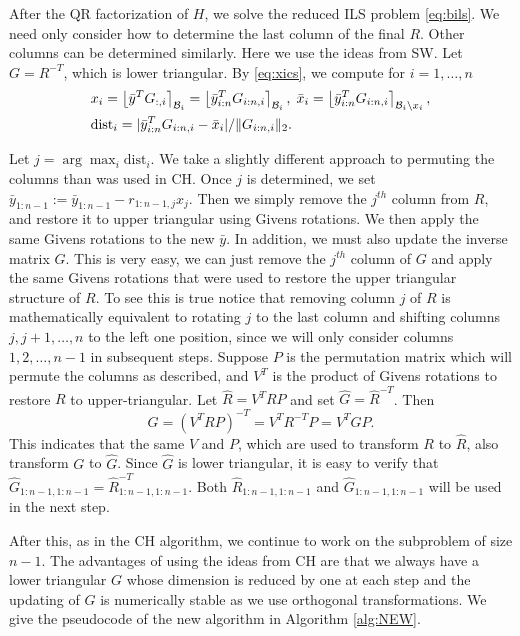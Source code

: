 \documentclass[conference]{IEEEtran}
\newcommand{\dist}{\mathrm{dist}}
\begin{document}
After the QR factorization of $H$, we  solve the reduced ILS problem \eqref{eq:bils}.
We need only consider how to determine the last column of the final $R$.
Other columns can be determined similarly. 
Here we use the ideas from SW.
Let $G=R^{-T}$, which is lower triangular.
By \eqref{eq:xics}, we compute for $i=1,\ldots, n$
\begin{align*}
& x_i = \left \lfloor \bar{y}^TG_{:,i} \right \rceil_{{\cal B}_i} 
=\left \lfloor \bar{y}_{i:n}^T G_{i:n,i} \right \rceil_{{\cal B}_i}, \;
\bar{x}_i=\left \lfloor \bar{y}_{i:n}^T G_{i:n,i} \right \rceil_{{\cal B}_i\backslash x_i}, \\
& \dist_i = |\bar{y}_{i:n}^T G_{i:n,i}-\bar{x}_i|/\|G_{i:n,i}\|_2.
\end{align*}

Let $j=\arg\max_{i} \dist_i$. We  take a slightly different approach to
permuting the columns than was used in CH. Once $j$ is determined, we  
set $\bar{y}_{1:n-1} := \bar{y}_{1:n-1} - r_{1:n-1,j}x_j$. Then we simply remove
the $j^{th}$ column from $R$, and restore it to upper triangular using
Givens rotations. We then apply the same Givens rotations to the new
$\bar{y}$. In addition, we must also update the inverse matrix $G$. This is
very easy, we can just remove the $j^{th}$ column of $G$ and apply the same
Givens rotations that were used to restore the upper triangular structure of
$R$. To see this is true notice that removing column $j$ of $R$ is
mathematically equivalent to rotating $j$ to the last column and shifting
columns $j, j+1, \ldots, n$ to the left one position, since we will only consider columns
$1, 2, \ldots, n-1$ in subsequent steps. Suppose $P$ is the permutation matrix which
will permute the columns as described, and $V^T$ is the product of Givens
rotations to restore $R$ to upper-triangular. Let $\hat{R} = V^TRP$ and set
$\hat{G} = \hat{R}^{-T}$. Then
$$
\hat{G} = (V^TRP)^{-T} = V^TR^{-T}P = V^TGP.
$$
This indicates that  the same $V$ and $P$, which are used to transform $R$ to  $\hat{R}$, 
also transform $G$ to $\hat{G}$.
Since $\hat{G}$ is lower triangular, it is easy to verify that
$\hat{G}_{1:n-1,1:n-1} = \hat{R}^{-T}_{1:n-1,1:n-1}$.
Both $\hat{R}_{1:n-1,1:n-1}$ and $\hat{G}_{1:n-1,1:n-1}$ will be used in the next step.

After this, as in the CH algorithm, we continue to work on the subproblem of size $n-1$. 
The advantages of using the ideas from CH are that we always have a lower triangular $G$
whose dimension is reduced by one at each step
and the updating of $G$ is numerically stable as we use orthogonal transformations.
We give the pseudocode of the new algorithm in Algorithm  \ref{alg:NEW}.
\end{document}

